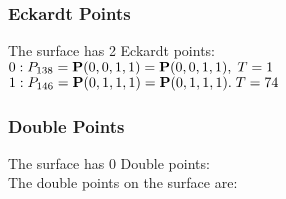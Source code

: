 \documentclass{article}
\newcommand{\bP}{{\bf P}}
\begin{document}
{\subsubsection*{Eckardt Points}
The surface has 2 Eckardt points:\\
$0 : P_{138}=\bP(0, 0, 1, 1) = \bP(0, 0, 1, 1),\; T= 1$\\
$1 : P_{146}=\bP(0, 1, 1, 1) = \bP(0, 1, 1, 1).\; T= 74$\\
\subsubsection*{Double Points}
The surface has 0 Double points:\\
The double points on the surface are:\\
\begin{multicols}{2}
\noindent
\end{multicols}
}
\end{document}
